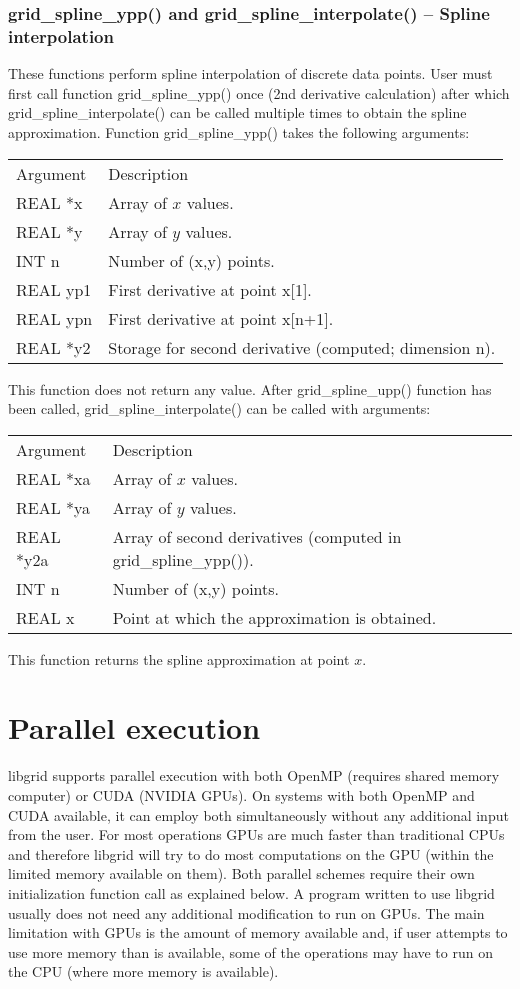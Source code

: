\documentclass[12pt,letterpaper]{report}
\begin{document}
\subsection{grid\_spline\_ypp() and grid\_spline\_interpolate() -- Spline interpolation}

These functions perform spline interpolation of discrete data points. User must first call function grid\_spline\_ypp() once (2nd derivative calculation) after which grid\_spline\_interpolate() can be called multiple times to obtain the spline approximation. Function grid\_spline\_ypp() takes the following arguments:
\begin{longtable}{p{} p{}}
Argument & Description\\
\cline{1-2}
REAL *x & Array of $x$ values.\\
REAL *y & Array of $y$ values.\\
INT n & Number of (x,y) points.\\
REAL yp1 & First derivative at point x[1].\\
REAL ypn & First derivative at point x[n+1].\\
REAL *y2 & Storage for second derivative (computed; dimension n).\\
\end{longtable}
\noindent
This function does not return any value. After grid\_spline\_upp() function has been called, grid\_spline\_interpolate() can be called with arguments:
\begin{longtable}{p{} p{}}
Argument & Description\\
\cline{1-2}
REAL *xa & Array of $x$ values.\\
REAL *ya & Array of $y$ values.\\
REAL *y2a & Array of second derivatives (computed in grid\_spline\_ypp()).\\
INT n & Number of (x,y) points.\\
REAL x & Point at which the approximation is obtained.\\
\end{longtable}
\noindent
This function returns the spline approximation at point $x$.

\chapter{Parallel execution}

libgrid supports parallel execution with both OpenMP (requires shared memory computer) or CUDA (NVIDIA GPUs). On systems with both OpenMP and CUDA available, it can employ both simultaneously without any additional input from the user. For most operations GPUs are much faster than traditional CPUs and therefore libgrid will try to do most computations on the GPU (within the limited memory available on them). Both parallel schemes require their own initialization function call as explained below. A program written to use libgrid usually does not need any additional modification to run on GPUs. The main limitation with GPUs is the amount of memory available and, if user attempts to use more memory than is available, some of the operations may have to run on the CPU (where more memory is available).
\end{document}
